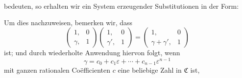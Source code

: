 bedeuten, so erhalten wir ein System erzeugender Substitutionen in der Form:

Um dies nachzuweisen, bemerken wir, dass
\[ \begin{pmatrix} 1, & 0 \\ \gamma, & 1 \end{pmatrix} \begin{pmatrix} 1, & 0 \\ \gamma', & 1 \end{pmatrix} = \begin{pmatrix} 1, & 0 \\ \gamma + \gamma', & 1 \end{pmatrix} \]
ist; und durch wiederholte Anwendung hiervon folgt, wenn
\[ \gamma = c_0 + c_1 \varepsilon + \cdots + c_{n-1} \varepsilon^{n-1} \]
mit ganzen rationalen Co\"efficienten $c$ eine beliebige Zahl in $\mathfrak{C}$ ist,

